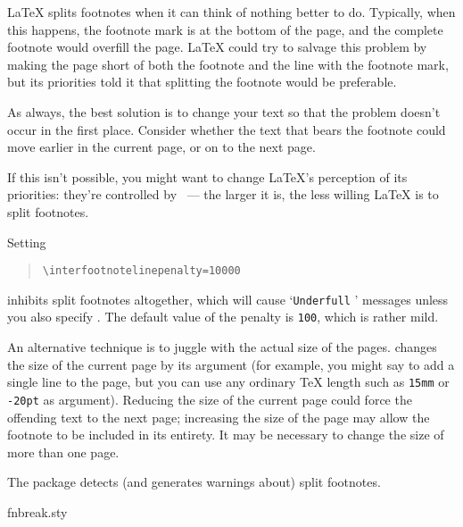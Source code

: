 \LaTeX{} splits footnotes when it can think of nothing better to do.
Typically, when this happens, the footnote mark is at the bottom of
the page, and the complete footnote would overfill the page.  \LaTeX{}
could try to salvage this problem by making the page short of both the
footnote and the line with the footnote mark, but its priorities told
it that splitting the footnote would be preferable.

As always, the best solution is to change your text so that the
problem doesn't occur in the first place.  Consider whether the text
that bears the footnote could move earlier in the current page, or on
to the next page.

If this isn't possible, you might want to change \LaTeX{}'s perception
of its priorities: they're controlled by
~--- the larger it is, the less willing
\LaTeX{} is to split footnotes.

Setting
\begin{quote}
\begin{verbatim}
\interfootnotelinepenalty=10000
\end{verbatim}
\end{quote}
inhibits split footnotes altogether, which will cause `\texttt{Underfull}
' messages unless you also specify .  The
default value of the penalty is \texttt{100}, which is rather mild.

An alternative technique is to juggle with the actual size of the
pages.   changes the size of the current page by
its argument (for example, you might say
 to add a single line
to the page, but you can use any ordinary \TeX{} length such as
\texttt{15mm} or \texttt{-20pt} as argument).  Reducing the size of
the current page could force the offending text to the next page;
increasing the size of the page may allow the footnote to be included
in its entirety.  It may be necessary to change the size of more than
one page.

The  package detects (and generates warnings about)
split footnotes.
\begin{ctanrefs}
\item[fnbreak.sty]
\end{ctanrefs}


